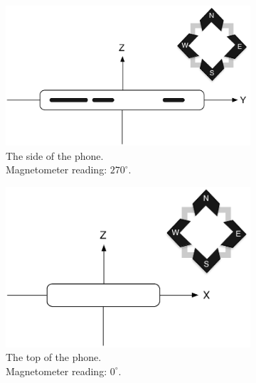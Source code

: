 \begin{figure}[H]
	\centering
	\begin{subfigure}[b]{0.45\textwidth}
		\centering
		\includegraphics[scale = 0.4]{media/phone-rotation/phone-compass-a}
        \caption[caption]{The side of the phone.\\Magnetometer reading: $270^{\circ}$.}
		\label{figure:position-yz}
	\end{subfigure}
	\qquad
	\begin{subfigure}[b]{0.45\textwidth}
		\centering
		\includegraphics[scale = 0.4]{media/phone-rotation/phone-compass-b}
        \caption[caption]{The top of the phone.\\Magnetometer reading: $0^{\circ}$.}
		\label{figure:position-xz}
	\end{subfigure}
	\begin{subfigure}[b]{0.45\textwidth}
		\centering

\end{subfigure}
\end{figure}
